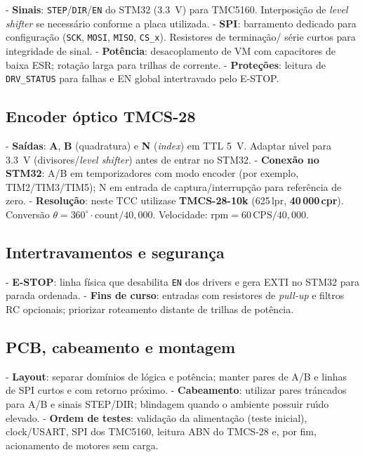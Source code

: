 - \textbf{Sinais}: \texttt{STEP}/\texttt{DIR}/\texttt{EN} do STM32 (\SI{3.3}{V})
  para TMC5160. Interposi\c{c}\~ao de \emph{level shifter} se necess\'ario
  conforme a placa utilizada.
- \textbf{SPI}: barramento dedicado para configura\c{c}\~ao (\texttt{SCK},
  \texttt{MOSI}, \texttt{MISO}, \texttt{CS\_x}). Resistores de termina\c{c}\~ao/
  s\'erie curtos para integridade de sinal.
- \textbf{Pot\^encia}: desacoplamento de VM com capacitores de baixa ESR;
  rota\c{c}\~ao larga para trilhas de corrente.
- \textbf{Prote\c{c}\~oes}: leitura de \texttt{DRV\_STATUS} para falhas e EN
  global intertravado pelo E-STOP.

\subsection{Encoder \'{o}ptico TMCS-28}

- \textbf{Sa\'idas}: \textbf{A}, \textbf{B} (quadratura) e \textbf{N}
  (\emph{index}) em TTL \SI{5}{V}. Adaptar n\'{\i}vel para \SI{3.3}{V}
  (divisores/\emph{level shifter}) antes de entrar no STM32.
- \textbf{Conex\~ao no STM32}: A/B em temporizadores com modo encoder
  (por exemplo, TIM2/TIM3/TIM5); N em entrada de captura/interrup\c{c}\~ao para
  refer\^encia de zero.
- \textbf{Resolu\c{c}\~ao}: neste TCC utiliza\-se \textbf{TMCS-28-10k}
  (625\,lpr, \textbf{40\,000\,cpr}). Convers\~ao \(\theta = 360^{\circ}\cdot
  \text{count}/40{,}000\). Velocidade: \(\text{rpm} = 60\,\text{CPS}/40{,}000\).

\subsection{Intertravamentos e seguran\c{c}a}

- \textbf{E-STOP}: linha f\'isica que desabilita \texttt{EN} dos drivers e
  gera EXTI no STM32 para parada ordenada.
- \textbf{Fins de curso}: entradas com resistores de \emph{pull-up}
  e filtros RC opcionais; priorizar roteamento distante de trilhas de
  pot\^encia.

\subsection{PCB, cabeamento e montagem}

- \textbf{Layout}: separar dom\'inios de l\'ogica e pot\^encia; manter
  pares de A/B e linhas de SPI curtos e com retorno pr\'oximo.
- \textbf{Cabeamento}: utilizar pares tr\'ancados para A/B e sinais STEP/DIR;
  blindagem quando o ambiente possuir ru\'{\i}do elevado.
- \textbf{Ordem de testes}: valida\c{c}\~ao da alimenta\c{c}\~ao (teste inicial),
  clock/USART, SPI dos TMC5160, leitura ABN do TMCS-28 e, por fim,
  acionamento de motores sem carga.
